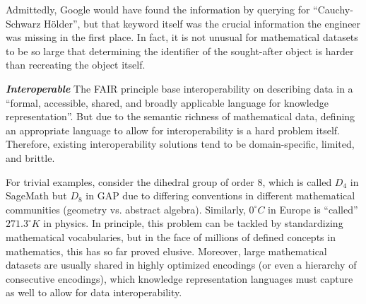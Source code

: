 Admittedly, Google would have found the information by querying for ``Cauchy-Schwarz H\"older'', but that keyword itself was the crucial information the engineer was missing in the first place. 
In fact, it is not unusual for mathematical datasets to be so large that determining the identifier of the sought-after object is harder than recreating the object itself.

\medskip

\textbf{\emph{Interoperable}}
The FAIR principle base interoperability on describing data in a ``formal, accessible, shared, and broadly applicable language for knowledge representation''.
But due to the semantic richness of mathematical data, defining an appropriate language to allow for interoperability is a hard problem itself.
Therefore, existing interoperability solutions tend to be domain-specific, limited, and brittle.

For trivial examples, consider the dihedral group of order 8, which is called $D_4$ in SageMath but $D_8$ in GAP due to differing conventions in different mathematical communities (geometry vs. abstract algebra).
Similarly, $0^\circ C$ in Europe is ``called'' $271.3^\circ K$ in physics.
In principle, this problem can be tackled by standardizing mathematical vocabularies, but in the face of millions of defined concepts in mathematics, this has so far proved elusive.
Moreover, large mathematical datasets are usually shared in highly optimized encodings (or even a hierarchy of consecutive encodings), which knowledge representation languages must capture as well to allow for data interoperability.


